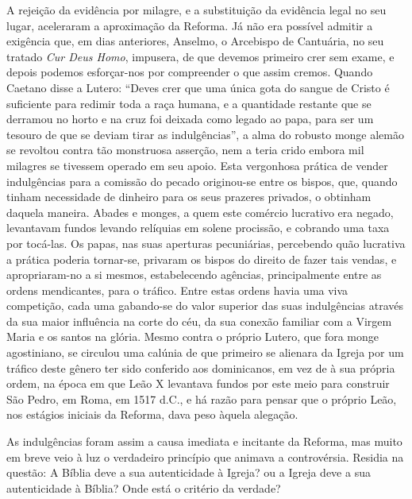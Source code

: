 \documentclass[11pt,a5paper,twoside,openany]{book}
\begin{document}
A rejeição da evidência por milagre, e a substituição da evidência legal no seu lugar, aceleraram a aproximação da Reforma. Já não era possível admitir a exigência que, em dias anteriores, Anselmo, o Arcebispo de Cantuária, no seu tratado \textit{Cur Deus Homo}, impusera, de que devemos primeiro crer sem exame, e depois podemos esforçar-nos por compreender o que assim cremos. Quando Caetano disse a Lutero: “Deves crer que uma única gota do sangue de Cristo é suficiente para redimir toda a raça humana, e a quantidade restante que se derramou no horto e na cruz foi deixada como legado ao papa, para ser um tesouro de que se deviam tirar as indulgências”, a alma do robusto monge alemão se revoltou contra tão monstruosa asserção, nem a teria crido embora mil milagres se tivessem operado em seu apoio. Esta vergonhosa prática de vender indulgências para a comissão do pecado originou-se entre os bispos, que, quando tinham necessidade de dinheiro para os seus prazeres privados, o obtinham daquela maneira. Abades e monges, a quem este comércio lucrativo era negado, levantavam fundos levando relíquias em solene procissão, e cobrando uma taxa por tocá-las. Os papas, nas suas aperturas pecuniárias, percebendo quão lucrativa a prática poderia tornar-se, privaram os bispos do direito de fazer tais vendas, e apropriaram-no a si mesmos, estabelecendo agências, principalmente entre as ordens mendicantes, para o tráfico. Entre estas ordens havia uma viva competição, cada uma gabando-se do valor superior das suas indulgências através da sua maior influência na corte do céu, da sua conexão familiar com a Virgem Maria e os santos na glória. Mesmo contra o próprio Lutero, que fora monge agostiniano, se circulou uma calúnia de que primeiro se alienara da Igreja por um tráfico deste gênero ter sido conferido aos dominicanos, em vez de à sua própria ordem, na época em que Leão X levantava fundos por este meio para construir São Pedro, em Roma, em 1517 d.C., e há razão para pensar que o próprio Leão, nos estágios iniciais da Reforma, dava peso àquela alegação.

As indulgências foram assim a causa imediata e incitante da Reforma, mas muito em breve veio à luz o verdadeiro princípio que animava a controvérsia. Residia na questão: A Bíblia deve a sua autenticidade à Igreja? ou a Igreja deve a sua autenticidade à Bíblia? Onde está o critério da verdade?
\end{document}
